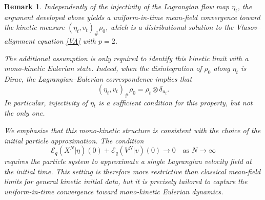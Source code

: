 \documentclass[10pt,reqno]{amsart}
\numberwithin{equation}{section}
\newtheorem{remark}{Remark}[section]
\begin{document}
   
\begin{remark}
Independently of the injectivity of the Lagrangian flow map $\eta_t$, the argument developed above yields a uniform-in-time mean-field convergence toward the kinetic measure $(\eta_t,v_t)_\#\rho_0$, which is a distributional solution to the Vlasov--alignment equation \eqref{VA} with $p=2$.

The additional assumption is only required to identify this kinetic limit with a mono-kinetic Eulerian state. Indeed, when the disintegration of $\rho_0$ along $\eta_t$ is Dirac, the Lagrangian--Eulerian correspondence implies that
\[
(\eta_t,v_t)_\#\rho_0 = \rho_t \otimes \delta_{u_t}.
\]
In particular, injectivity of $\eta_t$ is a sufficient condition for this property, but not the only one.

We emphasize that this mono-kinetic structure is consistent with the choice of the initial particle approximation. The condition
\[
\mathscr{E}_q(X^N|\eta)(0)+\mathscr{E}_q(V^N|v)(0)\to 0
\quad\text{as }N\to\infty
\]
requires the particle system to approximate a single Lagrangian velocity field at the initial time. This setting is therefore more restrictive than classical mean-field limits for general kinetic initial data, but it is precisely tailored to capture the uniform-in-time convergence toward mono-kinetic Eulerian dynamics.
\end{remark}
 


                      


 
\end{document}
